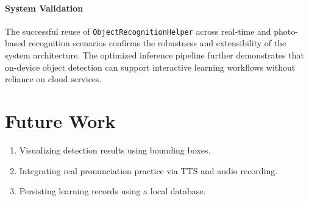 \documentclass[a4paper, 12pt]{article}
\begin{document}
    \paragraph{System Validation}
    The successful reuse of \texttt{ObjectRecognitionHelper} across real-time and photo-based recognition scenarios confirms the robustness and extensibility of the system architecture. The optimized inference pipeline further demonstrates that on-device object detection can support interactive learning workflows without reliance on cloud services.

    \section{Future Work}
    \begin{enumerate}
        \item Visualizing detection results using bounding boxes.
        \item Integrating real pronunciation practice via TTS and audio recording.
        \item Persisting learning records using a local database.
    \end{enumerate}
\end{document}
